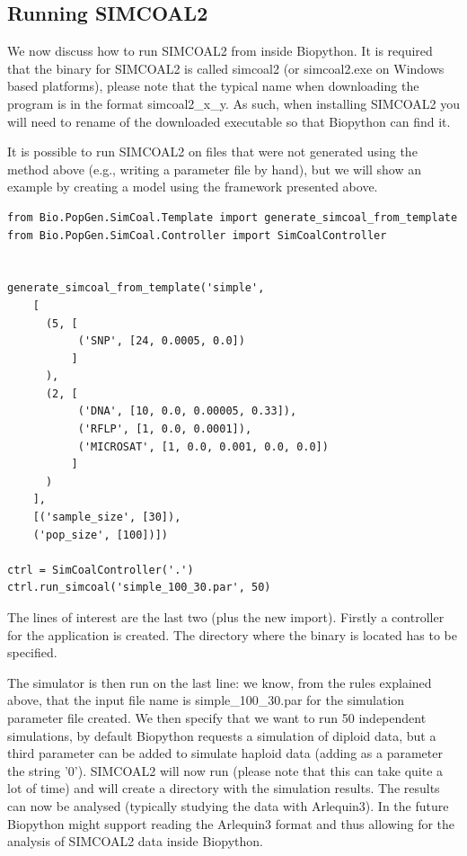 \documentclass{report}
\begin{document}
\subsection{Running SIMCOAL2}

We now discuss how to run SIMCOAL2 from inside Biopython. It is required
that the binary for SIMCOAL2 is called simcoal2 (or simcoal2.exe on Windows
based platforms), please note that the typical name when downloading the
program is in the format simcoal2\_x\_y. As such, when installing SIMCOAL2
you will need to rename of the downloaded executable so that Biopython can
find it.

It is possible to run SIMCOAL2 on files that were not generated using the method
above (e.g., writing a parameter file by hand), but we will show an
example by creating a model using the framework presented above.

\begin{verbatim}
from Bio.PopGen.SimCoal.Template import generate_simcoal_from_template
from Bio.PopGen.SimCoal.Controller import SimCoalController


generate_simcoal_from_template('simple',
    [
      (5, [
           ('SNP', [24, 0.0005, 0.0])
          ]
      ),
      (2, [
           ('DNA', [10, 0.0, 0.00005, 0.33]),
           ('RFLP', [1, 0.0, 0.0001]),
           ('MICROSAT', [1, 0.0, 0.001, 0.0, 0.0])
          ]
      )
    ],
    [('sample_size', [30]),
    ('pop_size', [100])])

ctrl = SimCoalController('.')
ctrl.run_simcoal('simple_100_30.par', 50)
\end{verbatim}

The lines of interest are the last two (plus the new import).
Firstly a controller for the
application is created. The directory where the binary is located has
to be specified.

The simulator is then run on the last line: we know, from the rules explained
above, that the input file name is simple\_100\_30.par for the
simulation parameter file created. We then specify
that we want to run 50 independent simulations, by default Biopython
requests a simulation of diploid data, but a third parameter can
be added to simulate haploid data (adding as a parameter the
string '0'). SIMCOAL2 will now run (please
note that this can take quite a lot of time) and will create a directory
with the simulation results. The results can now be analysed (typically
studying the data with Arlequin3). In the future Biopython might support
reading the Arlequin3 format and thus allowing for the analysis of SIMCOAL2
data inside Biopython.
\end{document}
